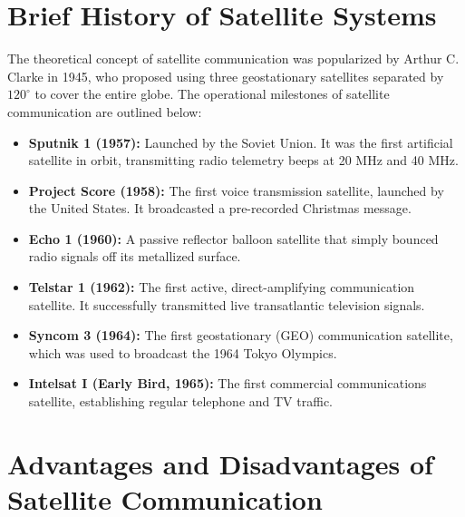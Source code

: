 \documentclass[12pt,a4paper]{article}
\begin{document}
\section{Brief History of Satellite Systems}

The theoretical concept of satellite communication was popularized by Arthur C. Clarke in 1945, who proposed using three geostationary satellites separated by $120^\circ$ to cover the entire globe. The operational milestones of satellite communication are outlined below:

\begin{itemize}[leftmargin=*, itemsep=3pt]
  \item \textbf{Sputnik 1 (1957):} Launched by the Soviet Union. It was the first artificial satellite in orbit, transmitting radio telemetry beeps at 20 MHz and 40 MHz.
  \item \textbf{Project Score (1958):} The first voice transmission satellite, launched by the United States. It broadcasted a pre-recorded Christmas message.
  \item \textbf{Echo 1 (1960):} A passive reflector balloon satellite that simply bounced radio signals off its metallized surface.
  \item \textbf{Telstar 1 (1962):} The first active, direct-amplifying communication satellite. It successfully transmitted live transatlantic television signals.
  \item \textbf{Syncom 3 (1964):} The first geostationary (GEO) communication satellite, which was used to broadcast the 1964 Tokyo Olympics.
  \item \textbf{Intelsat I (Early Bird, 1965):} The first commercial communications satellite, establishing regular telephone and TV traffic.
\end{itemize}

\section{Advantages and Disadvantages of Satellite Communication}
\end{document}
